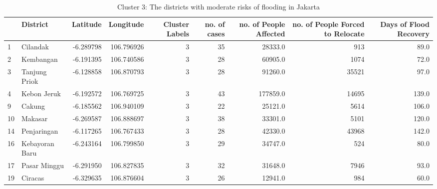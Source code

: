 \begin{table}
\centering
\caption{Cluster 3: The districts with moderate risks of flooding in Jakarta}
\label{tab:3}
\begin{adjustbox}{width=\textwidth}
\begin{tabular}{llrrrrrrr}
\toprule
{} &           District &  Latitude &   Longitude &  Cluster Labels &  no. of cases &  no. of People Affected &  no. of People Forced to Relocate &  Days of Flood Recovery \\
\midrule
1  &           Cilandak & -6.289798 &  106.796926 &               3 &            35 &                 28333.0 &                               913 &                    89.0 \\
2  &          Kembangan & -6.191395 &  106.740586 &               3 &            28 &                 60905.0 &                              1074 &                    72.0 \\
3  &      Tanjung Priok & -6.128858 &  106.870793 &               3 &            28 &                 91260.0 &                             35521 &                    97.0 \\
4  &        Kebon Jeruk & -6.192572 &  106.769725 &               3 &            43 &                177859.0 &                             14695 &                   139.0 \\
9  &             Cakung & -6.185562 &  106.940109 &               3 &            22 &                 25121.0 &                              5614 &                   106.0 \\
10 &            Makasar & -6.269587 &  106.888697 &               3 &            38 &                 33301.0 &                              5101 &                   120.0 \\
14 &        Penjaringan & -6.117265 &  106.767433 &               3 &            28 &                 42330.0 &                             43968 &                   142.0 \\
16 &     Kebayoran Baru & -6.243164 &  106.799850 &               3 &            29 &                 34747.0 &                               524 &                    80.0 \\
17 &       Pasar Minggu & -6.291950 &  106.827835 &               3 &            32 &                 31648.0 &                              7946 &                    93.0 \\
19 &            Ciracas & -6.329635 &  106.876604 &               3 &            26 &                 12941.0 &                               984 &                    60.0 \\

\end{tabular}
\end{adjustbox}
\end{table}
